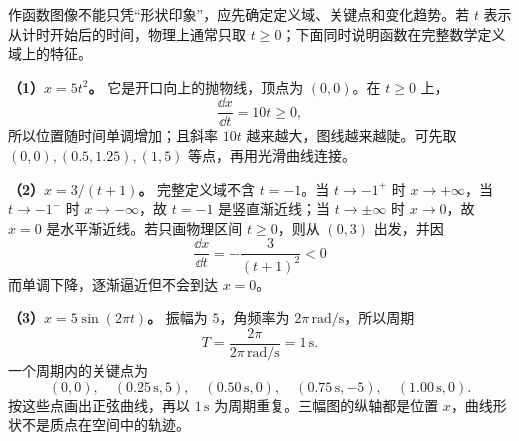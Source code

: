 {\begin{xesolution}
作函数图像不能只凭“形状印象”，应先确定定义域、关键点和变化趋势。若 $t$ 表示从计时开始后的时间，物理上通常只取 $t\ge0$；下面同时说明函数在完整数学定义域上的特征。

\textbf{（1）$x=5t^2$。}
它是开口向上的抛物线，顶点为 $(0,0)$。在 $t\ge0$ 上，
\[
 \frac{\dd x}{\dd t}=10t\ge0,
\]
所以位置随时间单调增加；且斜率 $10t$ 越来越大，图线越来越陡。可先取
$(0,0),(0.5,1.25),(1,5)$ 等点，再用光滑曲线连接。

\textbf{（2）$x=3/(t+1)$。}
完整定义域不含 $t=-1$。当 $t\to-1^+$ 时 $x\to+\infty$，当
$t\to-1^-$ 时 $x\to-\infty$，故 $t=-1$ 是竖直渐近线；当
$t\to\pm\infty$ 时 $x\to0$，故 $x=0$ 是水平渐近线。若只画物理区间
$t\ge0$，则从 $(0,3)$ 出发，并因
\[
 \frac{\dd x}{\dd t}=-\frac{3}{(t+1)^2}<0
\]
而单调下降，逐渐逼近但不会到达 $x=0$。

\textbf{（3）$x=5\sin(2\pi t)$。}
振幅为 $5$，角频率为 $2\pi\,\mathrm{rad/s}$，所以周期
\[
 T=\frac{2\pi}{2\pi\,\mathrm{rad/s}}=1\,\mathrm s.
\]
一个周期内的关键点为
\[
 (0,0),\quad (0.25\,\mathrm s,5),\quad (0.50\,\mathrm s,0),
 \quad (0.75\,\mathrm s,-5),\quad (1.00\,\mathrm s,0).
\]
按这些点画出正弦曲线，再以 $1\,\mathrm s$ 为周期重复。三幅图的纵轴都是位置 $x$，曲线形状不是质点在空间中的轨迹。
\begin{center}\begin{qualityfigure}
\label{mech:legacy:ch02:k02-2-2}
\end{qualityfigure}\end{center}
\end{xesolution}

}
